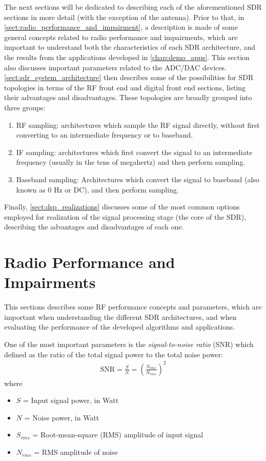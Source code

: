 The next sections will be dedicated to describing each of the aforementioned SDR sections in more detail (with the exception of the antenna). Prior to that, in \autoref{sect:radio_performance_and_impairment}, a description is made of some general concepts related to radio performance and impairments, which are important to understand both the characteristics of each SDR architecture, and the results from the applications developed in \autoref{chap:demo_apps}. This section also discusses important parameters related to the ADC/DAC devices. \autoref{sect:sdr_system_architecture} then describes some of the possibilities for SDR topologies in terms of the RF front end and digital front end sections, listing their advantages and disadvantages. These topologies are broadly grouped into three groups:
\begin{enumerate}
  \item RF sampling: architectures which sample the RF signal directly, without first converting to an intermediate frequency or to baseband.
  \item IF sampling: architectures which first convert the signal to an intermediate frequency (usually in the tens of megahertz) and then perform sampling.
  \item Baseband sampling: Architectures which convert the signal to baseband (also known as 0 Hz or DC), and then perform sampling.
\end{enumerate}


Finally, \autoref{sect:dsp_realizations} discusses some of the most common options employed for realization of the signal processing stage (the core of the SDR), describing the advantages and disadvantages of each one.

\section{Radio Performance and Impairments}
\label{sect:radio_performance_and_impairment}

This sections describes some RF performance concepts and parameters, which are important when understanding the different SDR architectures, and when evaluating the performance of the developed algorithms and applications.

One of the most important parameters is the \emph{signal-to-noise ratio} (SNR) which defined as the ratio of the total signal power to the total noise power:
\begin{align}
  \text{SNR} = \frac{S}{N} = \left(\frac{S_{rms}}{N_{rms}}\right)^2
\end{align}
where
\begin{itemize}
  \item $S$ = Input signal power, in Watt
  \item $N$ = Noise power, in Watt
  \item $S_{rms}$ = Root-mean-square (RMS) amplitude of input signal
  \item $N_{rms}$ = RMS amplitude of noise
\end{itemize}

